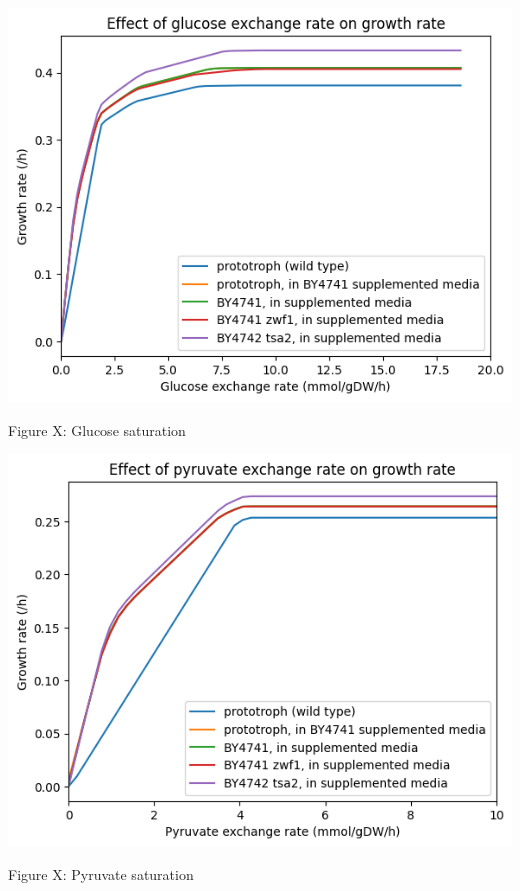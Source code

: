 \begin{center}
\includegraphics[width=.9\linewidth]{ecYeast8-glucose-saturation.png}
\end{center} Figure X: Glucose saturation

\begin{center}
\includegraphics[width=.9\linewidth]{ecYeast8-pyruvate-saturation.png}
\end{center} Figure X: Pyruvate saturation


